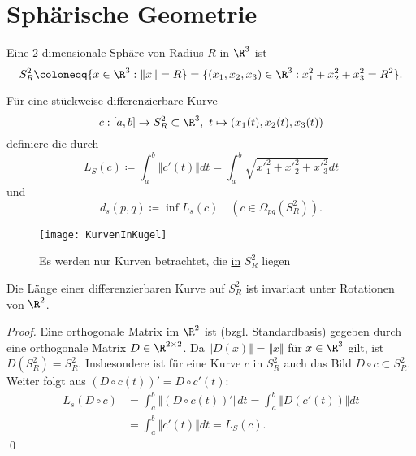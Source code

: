 \section{Sphärische Geometrie}
\begin{example}
  Eine \( 2 \)-dimensionale Sphäre von Radius \( R \) in \( \R^3 \) ist
  \begin{equation*}
    S^2_R \coloneqq \{ x \in \R^3 : \Vert x \Vert = R \} = \{ (x_1, x_2, x_3) \in \R^3 : x_1^2+x_2^2+x_3^2 = R^2 \}\text{.}
  \end{equation*}
  \begin{minipage}{.65\textwidth}
  Für eine stückweise differenzierbare Kurve
    \begin{equation*}
      c: [a,b] \to S^2_R \subset \R^3, \ t \mapsto (x_1(t), x_2(t), x_3(t))
    \end{equation*}
    definiere die  durch
    \begin{equation*}
      L_S(c) \coloneqq \int_a^b \Vert c'(t) \Vert dt = \int_a^b \sqrt{{x'}_1^2+{x'}_2^2+{x'}_3^2}dt
    \end{equation*}
    und
    \begin{equation*}
      d_s(p,q) \coloneqq \inf L_s(c) \quad (c \in \Omega_{pq}(S^2_R))\text{.}
    \end{equation*}
  \end{minipage}
  \hfill
  \begin{minipage}{.25\textwidth}
    \begin{figure}[H]
      \texttt{[image: KurvenInKugel]}
      \caption{Es werden nur Kurven betrachtet, die \underline{in} \( S_R^2 \) liegen}
    \end{figure}
  \end{minipage}
\end{example}

\begin{lemma}\label{lemma:kurvenlaengen}
  Die Länge einer differenzierbaren Kurve auf \( S^2_R \) ist invariant unter Rotationen von \( \R^2 \).
  \begin{proof}
    Eine orthogonale Matrix im \( \R^2 \) ist (bzgl. Standardbasis) gegeben durch eine orthogonale Matrix \( D \in \R^{2 \times 2} \). Da \( \Vert D(x) \Vert = \Vert x \Vert \) für \( x \in \R^3 \) gilt, ist \( D(S^2_R) = S^2_R \). Insbesondere ist für eine Kurve \( c \) in \( S^2_R \) auch das Bild \( D \circ c \subset S^2_R \). \\
    Weiter folgt aus \( (D \circ c(t))' = D \circ c'(t) \):
    \begin{align*}
      L_s(D \circ c) &= \int_a^b \Vert (D \circ c(t))' \Vert dt = \int_a^b \Vert D(c'(t)) \Vert dt \\
        &= \int_a^b \Vert c'(t) \Vert dt = L_S(c)\text{.}
    \end{align*}
    \qed{}
  \end{proof}
\end{lemma}

